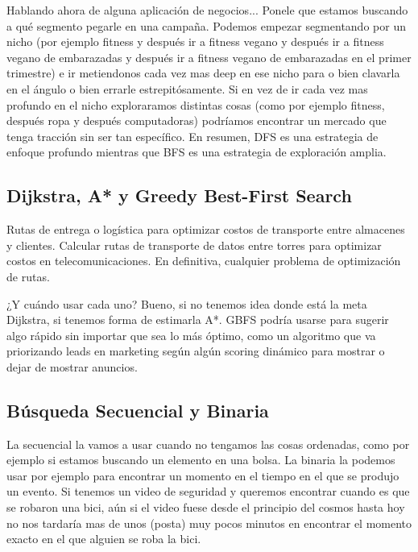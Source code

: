 \documentclass[12pt]{article}
\begin{document}
Hablando ahora de alguna aplicación de negocios... Ponele que estamos buscando a qué segmento pegarle en una campaña. Podemos empezar segmentando por un nicho (por ejemplo fitness y después ir a fitness vegano y después ir a fitness vegano de embarazadas y después ir a fitness vegano de embarazadas en el primer trimestre) e ir metiendonos cada vez mas deep en ese nicho para o bien clavarla en el ángulo o bien errarle estrepitósamente. Si en vez de ir cada vez mas profundo en el nicho exploraramos distintas cosas (como por ejemplo fitness, después ropa y después computadoras) podríamos encontrar un mercado que tenga tracción sin ser tan específico. En resumen, DFS es una estrategia de enfoque profundo mientras que BFS es una estrategia de exploración amplia.

\subsection{Dijkstra, A* y Greedy Best-First Search}

Rutas de entrega o logística para optimizar costos de transporte entre almacenes y clientes. Calcular rutas de transporte de datos entre torres para optimizar costos en telecomunicaciones. En definitiva, cualquier problema de optimización de rutas.

\vspace{0.5em}

¿Y cuándo usar cada uno? Bueno, si no tenemos idea donde está la meta Dijkstra, si tenemos forma de estimarla A*. GBFS podría usarse para sugerir algo rápido sin importar que sea lo más óptimo, como un algoritmo que va priorizando leads en marketing según algún scoring dinámico para mostrar o dejar de mostrar anuncios.

\subsection{Búsqueda Secuencial y Binaria}

La secuencial la vamos a usar cuando no tengamos las cosas ordenadas, como por ejemplo si estamos buscando un elemento en una bolsa. La binaria la podemos usar por ejemplo para encontrar un momento en el tiempo en el que se produjo un evento. Si tenemos un video de seguridad y queremos encontrar cuando es que se robaron una bici, aún si el video fuese desde el principio del cosmos hasta hoy no nos tardaría mas de unos (posta) muy pocos minutos en encontrar el momento exacto en el que alguien se roba la bici.
\end{document}
